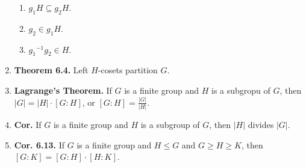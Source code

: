\documentclass[12pt]{article}
\theoremstyle{definition}
\theoremstyle{named}
\begin{document}
\begin{enumerate}
\begin{enumerate}
		\item $g_1H \subseteq g_2H$. 
		\item $g_2 \in g_1H$. 
		\item ${g_1}^{-1}g_2 \in H$. 
	\end{enumerate} 
	\item \textbf{Theorem 6.4. } Left $H$-cosets partition $G$. 
	\item \textbf{Lagrange's Theorem. } If $G$ is a finite group and $H$ is a subgropu of $G$, then $|G| = |H| \cdot [G:H]$, or $[G:H] = \frac{|G|}{|H|}$. 
	\item \textbf{Cor. } If $G$ is a finite group and $H$ is a subgroup of $G$, then $|H|$ divides $|G|$. 
	\item \textbf{Cor. 6.13. } If $G$ is a finite group and $H \leq G$ and $G \geq H \geq K$, then $[G:K] = [G:H] \cdot [H:K]$. 
\end{enumerate}
\end{document}
